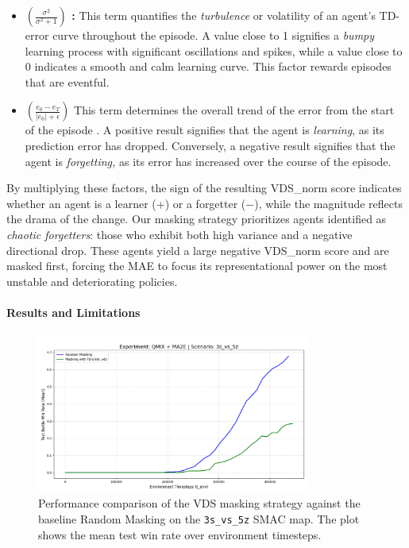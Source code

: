 \begin{itemize}
\item \textbf{$\left(\frac{\sigma^2}{\sigma^2 + 1}\right)$ : } This term quantifies the \textit{turbulence} or volatility of an agent's TD-error curve throughout the episode. A value close to 1 signifies a \textit{bumpy} learning process with significant oscillations and spikes, while a value close to 0 indicates a smooth and calm learning curve. This factor rewards episodes that are eventful.
\item \textbf{$\left(\frac{e_0 - e_T}{|e_0| + \epsilon}\right)$} This term determines the overall trend of the error from the start of the episode . A positive result signifies that the agent is \textit{learning}, as its prediction error has dropped. Conversely, a negative result signifies that the agent is \textit{forgetting,} as its error has increased over the course of the episode.
\end{itemize}

By multiplying these factors, the sign of the resulting VDS\_norm score indicates whether an agent is a learner (+) or a forgetter (−), while the magnitude reflects the drama of the change. Our masking strategy prioritizes agents identified as \textit{chaotic forgetters}: those who exhibit both high variance and a negative directional drop. These agents yield a large negative VDS\_norm score and are masked first, forcing the MAE to focus its representational power on the most unstable and deteriorating policies.

\paragraph{Results and Limitations}
\begin{figure}[H]
    \centering
    \includegraphics[width=0.8\textwidth]{images_pfe/results_li-ma2e/test_battle_won_mean_3s_vs_5z_vds_smoothed.png}
    \caption{Performance comparison of the VDS masking strategy against the baseline Random Masking on the \texttt{3s\_vs\_5z} SMAC map. The plot shows the mean test win rate over environment timesteps.}
    \label{fig:vds_vs_random}
\end{figure}

